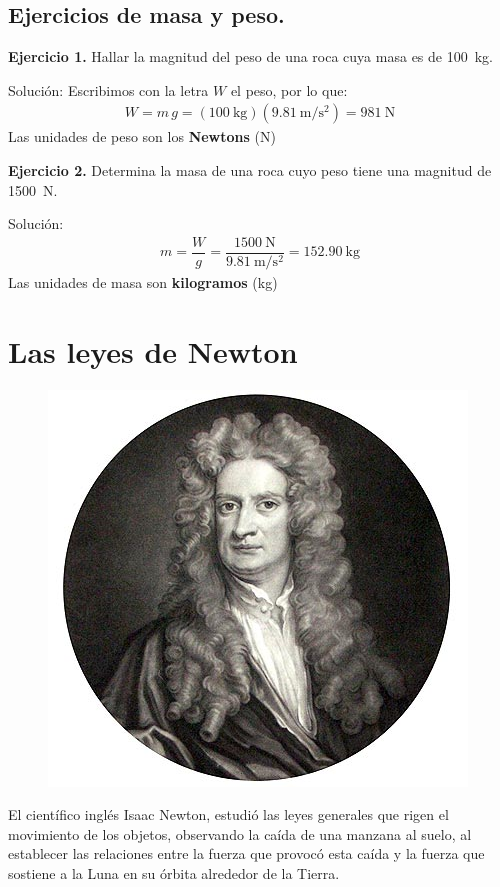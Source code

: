 \documentclass[14pt]{extarticle}
\begin{document}
\subsection{Ejercicios de masa y peso.}

\textbf{Ejercicio 1.} Hallar la magnitud del peso de una roca cuya masa es de \SI{100}{\kilo\gram}.

Solución: Escribimos con la letra $W$ el peso, por lo que:
\begin{align*}
W = m \, g = (\SI{100}{\kilo\gram})(\SI{9.81}{\meter\per\square\second}) = \SI{981}{\newton}
\end{align*}
Las unidades de peso son los \textbf{Newtons} (\unit{\newton})

\vspace*{0.5cm}
\textbf{Ejercicio 2.}  Determina la masa de una roca cuyo peso tiene una magnitud de \SI{1500}{\newton}.

Solución:
\begin{align*}
m = \dfrac{W}{g} = \dfrac{\SI{1500}{\newton}}{\SI{9.81}{\meter\per\square\second}} = \SI{152.90}{\kilo\gram}
\end{align*}
Las unidades de masa son \textbf{kilogramos} (\unit{\kilo\gram})

\section{Las leyes de Newton}

\begin{figure}
\centering
    \includegraphics[scale=0.35]{Imagenes/Newton.jpg}
\end{figure}
El científico inglés Isaac Newton, estudió las leyes generales que rigen el movimiento de los objetos, observando la caída de una manzana al suelo, al establecer las relaciones entre la fuerza que provocó esta caída y la fuerza que sostiene a la Luna en su órbita alrededor de la Tierra.
\end{document}
